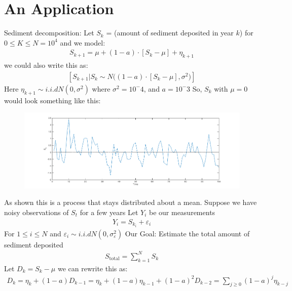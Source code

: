 \documentclass[../../../Master/AppliedStochastics.tex]{subfiles}
\author{Chandler}  %
\date{October 5}    %
\begin{document}
%


\makelecture %


\section{An Application}
Sediment decomposition: 
Let $S_{k}$ = (amount of sediment deposited in year $k$) for $0\leq K \leq N=10^4$ 
and we model: 
$$\begin{aligned}
	S_{k+1} = \mu + (1-a) \cdot [S_{k}-\mu] + \eta_{k+1}
\end{aligned}$$
we could also write this as: 
$$\begin{aligned}
[S_{k+1}\vert S_{k} \sim N\big((1-a) \cdot [S_{k}-\mu], \sigma^2\big)]
\end{aligned}$$
Here $\eta_{k+1} \sim i.i.d N(0, \sigma^2)$ where $\sigma^2 = 10^-4$, and $a=10^-3$
So, $S_{k}$ with $\mu=0$ would look something like this: 
\begin{figure}[H]
	\centering
	\includegraphics[width=0.7\linewidth]{process}
	\caption*{}
	\label{fig:process}
\end{figure}
As shown this is a process that stays distributed about a mean. 
Suppose we have noisy observations of $S_{t}$ for a few years 
Let $Y_{i}$ be our measurements 
$$\begin{aligned}
	Y_{i} = S_{k_{i}} + \varepsilon_{i}  
\end{aligned}$$
For $1 \leq i \leq N$ and $\varepsilon_{i} \sim i.i.d N(0, \sigma_{\varepsilon}^2)$ 
Our Goal: Estimate the total amount of sediment deposited 
$$\begin{aligned}
	S_{\mathrm{total}} = \sum_{k=1}^{N} S_{k}   
\end{aligned}$$
Let $D_{k} = S_{k}-\mu$ we can rewrite this as: 
$$\begin{aligned}
	D_{k} = \eta_{k} + (1-a)D_{k-1} =  \eta_{k} + (1-a)\eta_{k-1} + (1-a)^2 D_{k-2} = \sum_{j\geq0}(1-a)^j \eta_{k-j}
\end{aligned}$$
\end{document}
